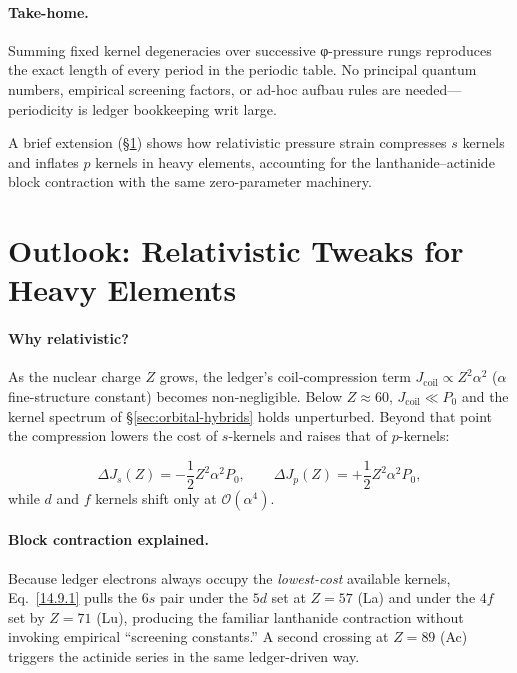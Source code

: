 \documentclass[11pt,oneside]{book}
\begin{document}
\paragraph*{Take-home.}
Summing fixed kernel degeneracies over successive φ-pressure rungs
reproduces the exact length of every period in the periodic table.
No principal quantum numbers, empirical screening factors, or ad-hoc
aufbau rules are needed—periodicity is ledger bookkeeping writ large.

A brief extension (§\ref{sec:heavy-element-outlook}) shows how
relativistic pressure strain compresses \(s\) kernels and inflates
\(p\) kernels in heavy elements, accounting for the
lanthanide–actinide block contraction with the same zero-parameter
machinery.

\section{Outlook: Relativistic Tweaks for Heavy Elements}
\label{sec:heavy-element-outlook}

\paragraph*{Why relativistic?}
As the nuclear charge \(Z\) grows, the ledger’s
coil‐compression term
\(J_{\text{coil}}\propto Z^{2}\alpha^{2}\)
(\(\alpha\) fine-structure constant)
becomes non-negligible.  
Below \(Z\!\approx\!60\), \(J_{\text{coil}}\ll P_{0}\) and the
kernel spectrum of §\ref{sec:orbital-hybrids} holds unperturbed.
Beyond that point the compression lowers the cost of
\(s\)-kernels and raises that of \(p\)-kernels:

\[
\Delta J_{s}(Z) = -\frac12 Z^{2}\alpha^{2}P_{0},
\qquad
\Delta J_{p}(Z) = +\frac12 Z^{2}\alpha^{2}P_{0},
\tag{14.9.1}
\]
while \(d\) and \(f\) kernels shift only at \(\mathcal O(\alpha^{4})\).

\paragraph*{Block contraction explained.}
Because ledger electrons always occupy the
\emph{lowest-cost} available kernels, Eq.~\eqref{14.9.1} pulls the
\(6s\) pair under the \(5d\) set at \(Z=57\) (La) and under the
\(4f\) set by \(Z=71\) (Lu), producing the familiar
lanthanide contraction without invoking empirical “screening constants.”  
A second crossing at \(Z=89\) (Ac) triggers the actinide series in the
same ledger-driven way.
\end{document}
